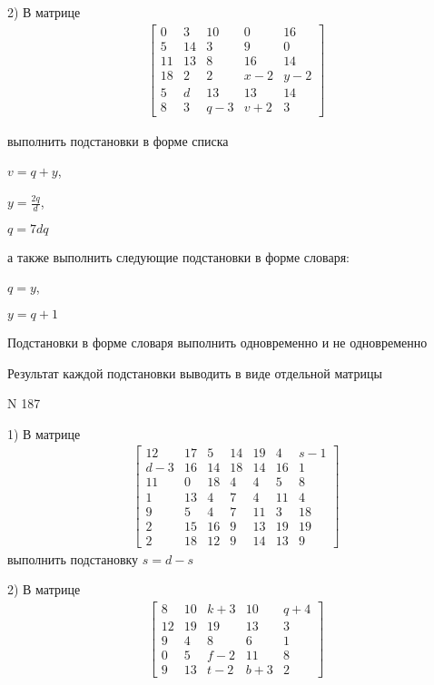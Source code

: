 \documentclass[11pt]{report}
\begin{document}
    2) В матрице
\begin{align*}
\left[\begin{matrix}0 & 3 & 10 & 0 & 16\\5 & 14 & 3 & 9 & 0\\11 & 13 & 8 & 16 & 14\\18 & 2 & 2 & x - 2 & y - 2\\5 & d & 13 & 13 & 14\\8 & 3 & q - 3 & v + 2 & 3\end{matrix}\right]
\end{align*}

выполнить подстановки в форме списка

$v=q + y$,

$y=\frac{2 q}{d}$,

$q=7 d q$

а также выполнить следующие подстановки в форме словаря:

$q=y$,

$y=q + 1$


    Подстановки в форме словаря выполнить одновременно и не одновременно


    Результат каждой подстановки выводить в виде отдельной матрицы

\newpage
N 187


    1) В матрице
\begin{align*}
\left[\begin{matrix}12 & 17 & 5 & 14 & 19 & 4 & s - 1\\d - 3 & 16 & 14 & 18 & 14 & 16 & 1\\11 & 0 & 18 & 4 & 4 & 5 & 8\\1 & 13 & 4 & 7 & 4 & 11 & 4\\9 & 5 & 4 & 7 & 11 & 3 & 18\\2 & 15 & 16 & 9 & 13 & 19 & 19\\2 & 18 & 12 & 9 & 14 & 13 & 9\end{matrix}\right]
\end{align*}
выполнить подстановку $s=d - s$


    2) В матрице
\begin{align*}
\left[\begin{matrix}8 & 10 & k + 3 & 10 & q + 4\\12 & 19 & 19 & 13 & 3\\9 & 4 & 8 & 6 & 1\\0 & 5 & f - 2 & 11 & 8\\9 & 13 & t - 2 & b + 3 & 2\end{matrix}\right]
\end{align*}
\end{document}
